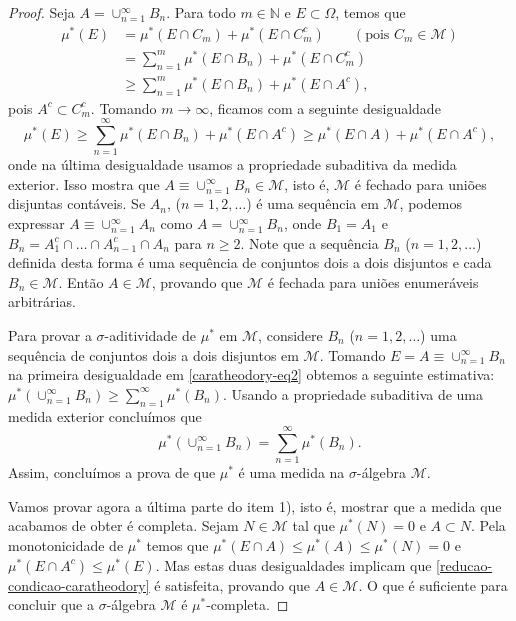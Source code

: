 \begin{proof}
Seja $A = \cup_{n=1}^{\infty}B_n $. 
Para todo $m\in\mathbb{N}$ e $E \subset \Omega$, temos que
\begin{align*}
    \mu^*(E)&= \mu^*(E\cap C_m) + \mu^*(E \cap C^c_m)
    \qquad (\text{pois  }  C_m \in \mathcal{M} ) \\
    & = \sum_{n=1}^m  \mu^*(E\cap B_n) + \mu^*(E \cap C^c_m)\\
    & \ge  \sum_{n=1}^m  \mu^*(E\cap B_n) + \mu^*(E \cap A^c),
\end{align*}
pois $ A^c \subset C^c_m$. Tomando $ m \to \infty $, ficamos com a seguinte desigualdade
\begin{equation} \label{caratheodory-eq2}
    \mu^*(E) \ge \sum_{n=1}^{\infty}  \mu^*(E\cap B_n) + \mu^*(E \cap A^c) \ge 
     \mu^*(E\cap A) + \mu^*(E \cap A^c),
\end{equation}
onde na última desigualdade usamos a propriedade 
subaditiva da medida exterior. Isso mostra que 
$ A \equiv \cup_{n=1}^{\infty} B_n \in \mathcal{M} $, 
isto é, $ \mathcal{M} $ é fechado para
uniões disjuntas contáveis. Se $A_n$, ($n=1,2,\ldots$) 
é uma sequência em $ \mathcal{M} $, 
podemos expressar $ A \equiv \cup_{n=1}^{\infty} A_n $ 
como $  A = \cup_{n=1}^{\infty}B_n$, onde
$ B_1 = A_1$ e $ B_n = A^c_1 \cap \dots \cap A^c_{n-1}\cap A_n$ para $ n \ge 2 $.
Note que a sequência $B_n$ ($n=1,2,\ldots$) definida desta forma é 
uma sequência de conjuntos dois a dois disjuntos e cada $B_n\in\mathcal{M}$. 
Então $ A \in \mathcal{M}$, provando que $ \mathcal{M}$
é fechada para uniões enumeráveis arbitrárias. 



Para provar a $\sigma$-aditividade de $ \mu^* $ em $ \mathcal{M}$, 
considere $B_n$ ($n=1,2,\ldots$) uma sequência de conjuntos 
dois a dois disjuntos em $\mathcal{M}$. 
Tomando $ E = A \equiv \cup_{n=1}^{\infty} B_n $ na primeira desigualdade em 
\eqref{caratheodory-eq2} obtemos a seguinte estimativa: 
$ \mu^*\left( \cup_{n=1}^{\infty} B_n \right)  \ge \sum_{n=1}^{\infty} \mu^*\left(  B_n \right) $. 
Usando a propriedade subaditiva de uma medida exterior concluímos que
$$ 
\mu^*\left( \cup_{n=1}^{\infty} B_n \right) = \sum_{n=1}^{\infty} \mu^*\left(  B_n \right).
$$
Assim, concluímos a prova de que $\mu^*$ é uma medida na $\sigma$-álgebra $ \mathcal{M}$. 

Vamos provar agora a última parte do item 1), isto é, 
mostrar que a medida que acabamos de obter é completa.
Sejam $N \in \mathcal{M}$ tal que $ \mu^*(N)=0$ e $A \subset N$. 
Pela monotonicidade de $\mu^*$ temos que 
$ \mu^*(E \cap A) \le \mu^*(A) \le \mu^*(N) = 0$ e $ \mu^*(E \cap A^c) \le \mu^*(E) $.
Mas estas duas desigualdades implicam
que \eqref{reducao-condicao-caratheodory} é satisfeita, provando que $ A \in \mathcal{M}$. 
O que é suficiente para concluir que a $\sigma$-álgebra $\mathcal{M} $ é $\mu^*$-completa.



\end{proof}
